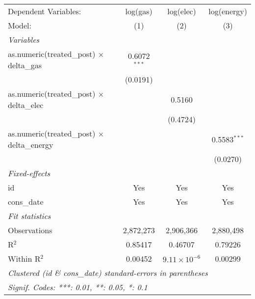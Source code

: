 
\begingroup
\centering
\begin{tabular}{lccc}
   \tabularnewline \midrule \midrule
   Dependent Variables:                                & log(gas)       & log(elec)             & log(energy)\\  
   Model:                                              & (1)            & (2)                   & (3)\\  
   \midrule
   \emph{Variables}\\
   as.numeric(treated\_post) $\times$ delta\_gas       & 0.6072$^{***}$ &                       &   \\   
                                                       & (0.0191)       &                       &   \\   
   as.numeric(treated\_post) $\times$ delta\_elec      &                & 0.5160                &   \\   
                                                       &                & (0.4724)              &   \\   
   as.numeric(treated\_post) $\times$ delta\_energy    &                &                       & 0.5583$^{***}$\\   
                                                       &                &                       & (0.0270)\\   
   \midrule
   \emph{Fixed-effects}\\
   id                                                  & Yes            & Yes                   & Yes\\  
   cons\_date                                          & Yes            & Yes                   & Yes\\  
   \midrule
   \emph{Fit statistics}\\
   Observations                                        & 2,872,273      & 2,906,366             & 2,880,498\\  
   R$^2$                                               & 0.85417        & 0.46707               & 0.79226\\  
   Within R$^2$                                        & 0.00452        & $9.11\times 10^{-6}$  & 0.00299\\  
   \midrule \midrule
   \multicolumn{4}{l}{\emph{Clustered (id \& cons\_date) standard-errors in parentheses}}\\
   \multicolumn{4}{l}{\emph{Signif. Codes: ***: 0.01, **: 0.05, *: 0.1}}\\
\end{tabular}
\par\endgroup


